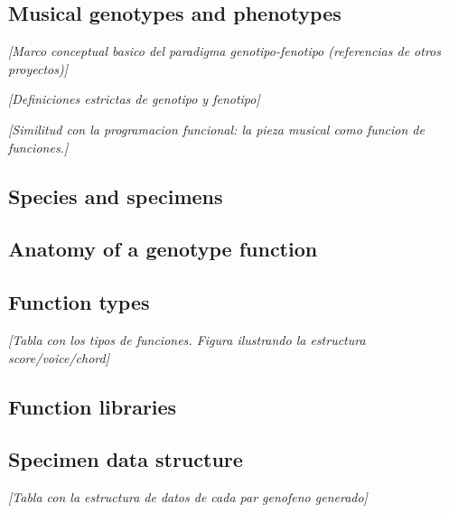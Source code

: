 \documentclass{article}
\begin{document}
\subsection{Musical genotypes and phenotypes}

{\color{gray} \textsl{[Marco conceptual basico del paradigma genotipo-fenotipo (referencias de otros proyectos)]}}

{\color{gray} \textsl{[Definiciones estrictas de genotipo y fenotipo]}}


{\color{gray} \textsl{[Similitud con la programacion funcional: la pieza musical como funcion de funciones.]}}

\subsection{Species and specimens}

\subsection{Anatomy of a genotype function}

\subsection{Function types}

{\color{gray} \textsl{[Tabla con los tipos de funciones. Figura ilustrando la estructura score/voice/chord]}}

\subsection{Function libraries}

\subsection{Specimen data structure}


{\color{gray} \textsl{[Tabla con la estructura de datos de cada par geno\/feno generado]}}



\end{document}
